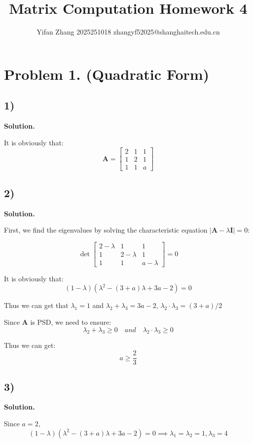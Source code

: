 \documentclass{article}
\title{\Huge Matrix Computation Homework 4}
\author{\normalsize Yifan Zhang  2025251018  zhangyf52025@shanghaitech.edu.cn}
\newcommand{\0}{{\mathbf{0}}} %
\newcommand{\A}{{\mathbf{A}}} %
\begin{document}
\maketitle

\section*{Problem 1. (Quadratic Form)}

\subsection*{1)}

\textbf{Solution.}

It is obviously that:
$$\mathbf{A} =
\begin{bmatrix} 2 & 1 & 1 \\ 1 & 2 & 1 \\ 1 & 1 & a
\end{bmatrix}$$

\subsection*{2)}

\textbf{Solution.}

First, we find the eigenvalues by solving the characteristic equation $|\mathbf{A} - \lambda \mathbf{I}| = 0$:

$$\det
\begin{bmatrix} 2-\lambda & 1 & 1 \\ 1 & 2-\lambda & 1 \\ 1 & 1 & a-\lambda
\end{bmatrix} = 0$$

It is obviously that:
$$
(1-\lambda)(\lambda^2 - (3+a)\lambda + 3a - 2) = 0
$$

Thus we can get that $\lambda_1 = 1$
and $\lambda_2 + \lambda_3 = 3a-2$, $\lambda_2 \cdot \lambda_3 = (3+a) / 2$

Since $\A$ is PSD, we need to ensure:
$$
\lambda_2 + \lambda_3 \ge 0 \quad and \quad \lambda_2 \cdot \lambda_3 \ge 0
$$

Thus we can get:
$$
a \ge \frac{2}{3}
$$

\subsection*{3)}

\textbf{Solution.}

Since $a = 2$,
$$
(1-\lambda)(\lambda^2 - (3+a)\lambda + 3a - 2) = 0 \implies
\lambda_1 = \lambda_2 = 1,\lambda_3 = 4
$$
\end{document}

